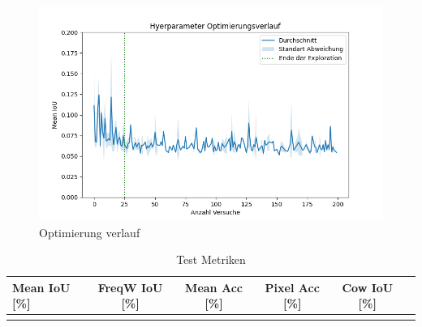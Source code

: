 \documentclass[12pt,DIV=15,BCOR=15mm,twoside,headsepline,abstract=true,listof=totoc,bibliography=totoc]{scrreprt}
\theoremstyle{remark}    %
\begin{document}
    \begin{figure}[ht]
        \centering
        \includegraphics[width=\linewidth]{pics/optimization.png}
        \caption{Optimierung verlauf}
    \end{figure}

    
    \begin{figure}
        
    \end{figure}

    \begin{table}[ht]
        \centering
        \caption{Test Metriken }
        \label{tab:test_results}
        \setlength{\tabcolsep}{5pt} 
        \renewcommand{\arraystretch}{1.3}
        \begin{tabular}{l*{5}{c}}
            \toprule
            \textbf{Mean IoU [\%]} & \textbf{FreqW IoU [\%]} & \textbf{Mean Acc [\%]} & \textbf{Pixel Acc [\%]} & \textbf{Cow IoU [\%]}\\
            \midrule
            &&&&&\\
            \bottomrule
        \end{tabular}
    \end{table}
\end{document}
